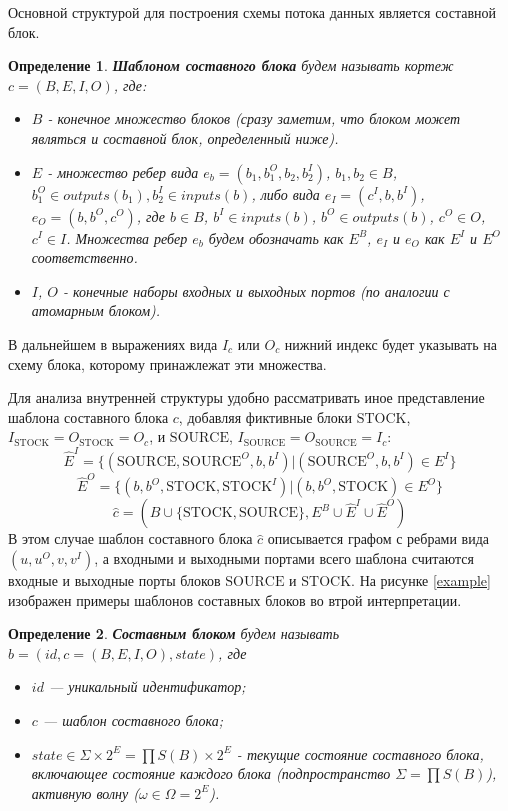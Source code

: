 \documentclass[10pt,a4paper]{article}
\newtheorem{defen}{Определение}
\newcommand{\stock}{\text{STOCK}}
\newcommand{\source}{\text{SOURCE}}
\begin{document}
Основной структурой для построения схемы потока данных является составной блок.

\begin{defen}
 \textbf{Шаблоном составного блока} будем называть кортеж $c = (B, E, I, O)$, где:
 \begin{itemize}
    \item $B$ - конечное множество блоков (сразу заметим, что блоком может являться и составной блок, определенный ниже).
    \item $E$ - множество ребер вида $e_b = (b_1, b^O_{1}, b_2, b^I_{2})$, $b_1, b_2 \in B$, $b^O_{1} \in outputs(b_1), b^I_{2} \in inputs(b)$,
                либо вида $e_I = (c^I, b, b^I)$, $e_O = (b, b^O, c^O)$, где $b \in B$, $b^I \in inputs(b)$, $b^O \in outputs(b)$, $c^O \in O$, $c^I \in I$.
                Множества ребер $e_b$ будем обозначать как $E^B$, $e_I$ и $e_O$ как $E^I$ и $E^O$ соответственно.
    \item $I$, $O$ - конечные наборы входных и выходных портов (по аналогии с атомарным блоком).
  \end{itemize}
\end{defen}

В дальнейшем в выражениях вида $I_c$ или $O_c$ нижний индекс будет указывать на схему блока, которому принажлежат эти множества.

Для анализа внутренней структуры удобно рассматривать иное представление шаблона составного блока $c$, добавляя фиктивные блоки $\stock$, $I_{\stock} = O_{\stock} = O_c$,
  и $\source$, $I_{\source} = O_{\source} = I_c$:
$$\hat{E}^I = \{(\source, \source^O, b, b^I) \vert (\source^O, b, b^I) \in E^I\}$$
$$\hat{E}^O = \{ (b, b^O, \stock, \stock^I) \vert (b, b^O, \stock) \in E^O \}$$
$$\hat{c} = (B \cup \{\stock, \source\}, E^B \cup \hat{E}^I \cup \hat{E}^O)$$
В этом случае шаблон составного блока $\hat{c}$ описывается графом с ребрами вида $(u, u^O, v, v^I)$,
а входными и выходными портами всего шаблона считаются входные и выходные порты блоков $\source$ и $\stock$.
На рисунке \ref{example} изображен примеры шаблонов составных блоков во втрой интерпретации.

\begin{defen}
  \textbf{Составным блоком} будем называть $b = (id, c = (B, E, I, O), state)$, где
  \begin{itemize}
    \item $id$ --- уникальный идентификатор;
    \item $c$ --- шаблон составного блока;
    \item $state \in \Sigma \times 2^E = \prod S(B) \times 2^E$ - текущие состояние составного блока, включающее
          состояние каждого блока (подпространство $\Sigma = \prod S(B)$), активную волну ($\omega \in \Omega = 2^E$).
  \end{itemize}
\end{defen}
\end{document}

